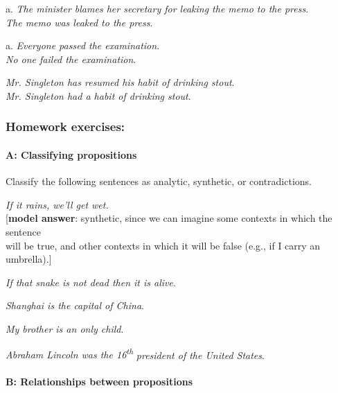 \begin{stylepoints}
\ea%
    \label{ex:key:3}

          a. \textit{The minister blames her secretary for leaking the memo to the press}.\\
\ex \textit{The memo was leaked to the press}.
\z
\end{stylepoints}

\begin{stylepoints}
\ea%
    \label{ex:key:4}
  
          a. \textit{Everyone passed the examination}.\\
\ex \textit{No one failed the examination}.
\z
\end{stylepoints}

\begin{stylepoints}
\ea%
    \label{ex:key:5}
\textit{Mr. Singleton has resumed his habit of drinking stout}.\\
\ex \textit{Mr. Singleton had a habit of drinking stout}.
    \z
\end{stylepoints}

\subsubsection{Homework exercises:}\label{sec:}
\paragraph{A: Classifying propositions}

Classify the following sentences as analytic, synthetic, or contradictions.

\ea
\ea \textit{If it rains, we’ll get wet.}\\
  {}[\textbf{model answer}: synthetic, since we can imagine some contexts in which the sentence\\
  will be true, and other contexts in which it will be false (e.g., if I carry an umbrella).]

\ex \textit{If that snake is not dead then it is alive}.

\ex \textit{Shanghai is the capital of China}.

\ex \textit{My brother is an only child}.

\ex \textit{Abraham Lincoln was the 16\textsuperscript{th}} \textit{president of the United States}.
                       \z
\z
\paragraph{B: Relationships between propositions}

